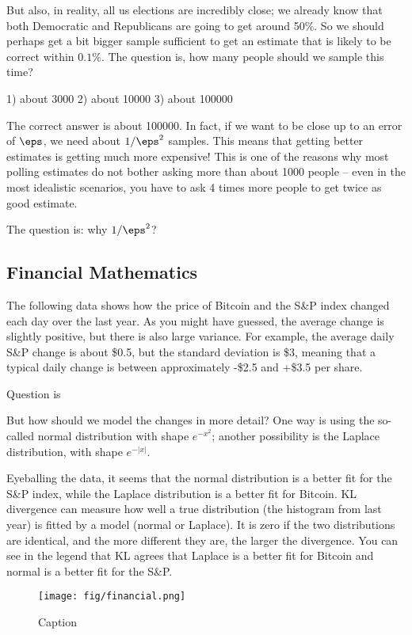 \documentclass{article}
\begin{document}
But also, in reality, all us elections are incredibly close; we already know that both Democratic and Republicans are going to get around 50\%. So we should perhaps get a bit bigger sample sufficient to get an estimate that is likely to be correct within $0.1\%$. The question is, how many people should we sample this time? 

1) about 3000
2) about 10000
3) about 100000

The correct answer is about 100000. In fact, if we want to be close up to an error of $\eps$, we need about $1/\eps^2$ samples. This means that getting better estimates is getting much more expensive! This is one of the reasons why most polling estimates do not bother asking more than about 1000 people -- even in the most idealistic scenarios, you have to ask 4 times more people to get twice as good estimate. 

The question is: why $1/\eps^2$? 

\subsection{Financial Mathematics}

The following data shows how the price of Bitcoin and the S\&P index changed each day over the last year. As you might have guessed, the average change is slightly positive, but there is also large variance. For example, the average daily S\&P change is about \$0.5, but the standard deviation is \$3, meaning that a typical daily change is between approximately -\$2.5 and +\$3.5 per share.

Question is

But how should we model the changes in more detail? One way is using the so-called normal distribution with shape \(e^{-x^2}\); another possibility is the Laplace distribution, with shape \(e^{-|x|}\).

Eyeballing the data, it seems that the normal distribution is a better fit for the S\&P index, while the Laplace distribution is a better fit for Bitcoin. KL divergence can measure how well a true distribution (the histogram from last year) is fitted by a model (normal or Laplace). It is zero if the two distributions are identical, and the more different they are, the larger the divergence. You can see in the legend that KL agrees that Laplace is a better fit for Bitcoin and normal is a better fit for the S\&P.

\begin{figure}
    \centering
    \texttt{[image: fig/financial.png]}
    \caption{Caption}
    \label{fig:enter-label}
\end{figure}
\end{document}

